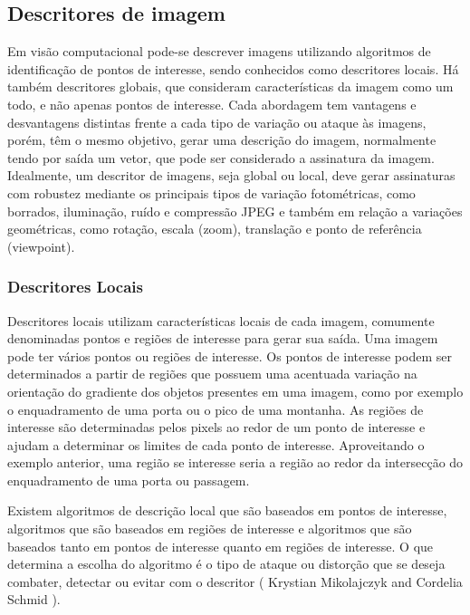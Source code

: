 \subsection{Descritores de imagem}
\label{descritores de imagem}

Em visão computacional pode-se descrever imagens utilizando algoritmos de identificação de pontos de interesse, sendo conhecidos como descritores locais. Há também descritores globais, que consideram características da imagem como um todo, e não apenas pontos de interesse. Cada abordagem tem vantagens e desvantagens distintas frente a cada tipo de variação ou ataque às imagens, porém, têm o mesmo objetivo, gerar uma descrição do imagem, normalmente tendo por saída um vetor, que pode ser considerado a assinatura da imagem. Idealmente, um descritor de imagens, seja global ou local, deve gerar assinaturas com robustez mediante os principais tipos de variação fotométricas, como borrados, iluminação, ruído e compressão JPEG e também em relação a variações geométricas, como rotação, escala (zoom), translação e ponto de referência (viewpoint).

\subsubsection{Descritores Locais}
\label{descritores locais}

Descritores locais utilizam características locais de cada imagem, comumente denominadas pontos e regiões de interesse para gerar sua saída. Uma imagem pode ter vários pontos ou regiões de interesse. Os pontos de interesse podem ser determinados a partir de regiões que possuem uma acentuada variação na orientação do gradiente dos objetos presentes em uma imagem, como por exemplo o enquadramento de uma porta ou o pico de uma montanha. As regiões de interesse são determinadas pelos pixels ao redor de um ponto de interesse e ajudam a determinar os limites de cada ponto de interesse. Aproveitando o exemplo anterior, uma região se interesse seria a região ao redor da intersecção do enquadramento de uma porta ou passagem.

Existem algoritmos de descrição local que são baseados em pontos de interesse, algoritmos que são baseados em regiões de interesse e algoritmos que são baseados tanto em pontos de interesse quanto em regiões de interesse. O que determina a escolha do algoritmo é o tipo de ataque ou distorção que se deseja combater, detectar ou evitar com o descritor ( Krystian Mikolajczyk and Cordelia Schmid ). 

